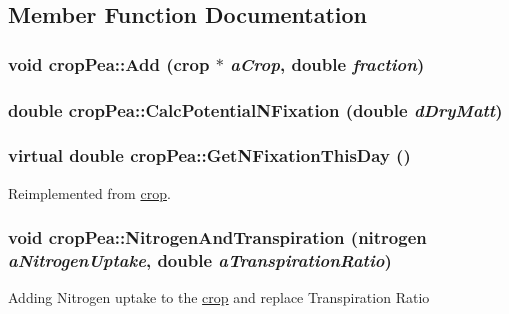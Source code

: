 \subsection{Member Function Documentation}
\hypertarget{classcrop_pea_ac56e0664c618ab5e8ead80d2259a02a8}{
\subsubsection[{Add}]{\setlength{\rightskip}{0pt plus 5cm}void cropPea::Add ({\bf crop} $\ast$ {\em aCrop}, \/  double {\em fraction})}}
\label{classcrop_pea_ac56e0664c618ab5e8ead80d2259a02a8}
\hypertarget{classcrop_pea_a926468b50eb7ba88b6e3c9641377ae10}{
\subsubsection[{CalcPotentialNFixation}]{\setlength{\rightskip}{0pt plus 5cm}double cropPea::CalcPotentialNFixation (double {\em dDryMatt})}}
\label{classcrop_pea_a926468b50eb7ba88b6e3c9641377ae10}
\hypertarget{classcrop_pea_ac337615ba724c897a369dd1ad85a951e}{
\subsubsection[{GetNFixationThisDay}]{\setlength{\rightskip}{0pt plus 5cm}virtual double cropPea::GetNFixationThisDay ()}}
\label{classcrop_pea_ac337615ba724c897a369dd1ad85a951e}


Reimplemented from \hyperlink{classcrop_aec045be7b4c6fd112b48ead6ee68dcd9}{crop}.\hypertarget{classcrop_pea_a2e984c9df88d272f2caade355a36fff7}{
\subsubsection[{NitrogenAndTranspiration}]{\setlength{\rightskip}{0pt plus 5cm}void cropPea::NitrogenAndTranspiration ({\bf nitrogen} {\em aNitrogenUptake}, \/  double {\em aTranspirationRatio})}}
\label{classcrop_pea_a2e984c9df88d272f2caade355a36fff7}
Adding Nitrogen uptake to the \hyperlink{classcrop}{crop} and replace Transpiration Ratio 

